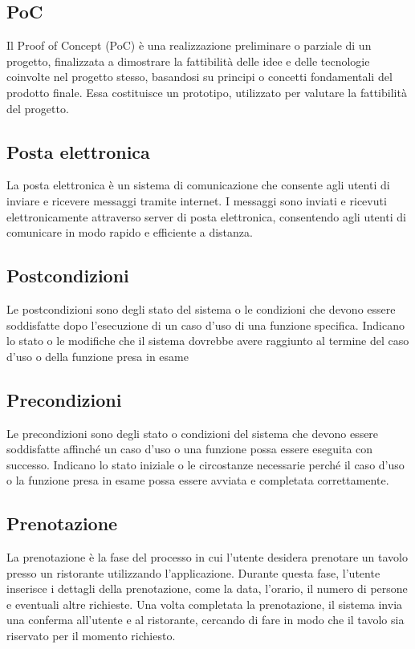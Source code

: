 \subsection{PoC} 
Il  Proof of Concept (PoC) è una realizzazione preliminare o parziale di un progetto, finalizzata a dimostrare la fattibilità delle idee e delle tecnologie coinvolte nel progetto stesso, basandosi su principi o concetti fondamentali del prodotto finale. Essa costituisce un prototipo, utilizzato per valutare la fattibilità del progetto. 
\subsection{Posta elettronica} 
La posta elettronica è un sistema di comunicazione che consente agli utenti di inviare e ricevere messaggi tramite internet. I messaggi sono inviati e ricevuti elettronicamente attraverso server di posta elettronica, consentendo agli utenti di comunicare in modo rapido e efficiente a distanza. 
\subsection{Postcondizioni} 
Le postcondizioni sono degli stato del sistema o le condizioni che devono essere soddisfatte dopo l'esecuzione di un caso d'uso di una funzione specifica. Indicano lo stato o le modifiche che il sistema dovrebbe avere raggiunto al termine del caso d'uso o della funzione presa in esame 
\subsection{Precondizioni} 
Le precondizioni sono degli stato o condizioni del sistema che devono essere soddisfatte affinché un caso d'uso o una funzione possa essere eseguita con successo. Indicano lo stato iniziale o le circostanze necessarie perché il caso d'uso o la funzione presa in esame possa essere avviata e completata correttamente. 
\subsection{Prenotazione} 
La prenotazione è la fase del processo in cui l'utente desidera prenotare un tavolo presso un ristorante utilizzando l'applicazione. Durante questa fase, l'utente inserisce i dettagli della prenotazione, come la data, l'orario, il numero di persone e eventuali altre richieste. Una volta completata la prenotazione, il sistema invia una conferma all'utente e al ristorante, cercando di fare in modo che il tavolo sia riservato per il momento richiesto. 

